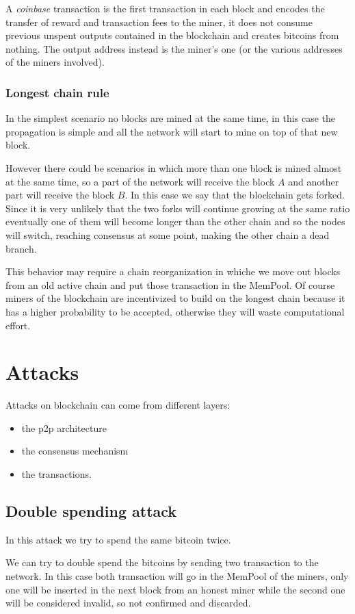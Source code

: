 A \emph{coinbase} transaction is the first transaction in each block and encodes the transfer of reward and transaction fees to the miner, it does not consume previous unspent outputs contained in the blockchain and creates bitcoins from nothing.
The output address instead is the miner's one (or the various addresses of the miners involved).

\subsubsection{Longest chain rule}
In the simplest scenario no blocks are mined at the same time, in this case the propagation is simple and all the network will start to mine on top of that new block.

However there could be scenarios in which more than one block is mined almost at the same time, so a part of the network will receive the block $A$ and another part will receive the block $B$.
In this case we say that the blockchain gets forked.
Since it is very unlikely that the two forks will continue growing at the same ratio eventually one of them will become longer than the other chain and so the nodes will switch, reaching consensus at some point, making the other chain a dead branch.

This behavior may require a chain reorganization in whiche we move out blocks from an old active chain and put those transaction in the MemPool.
Of course miners of the blockchain are incentivized to build on the longest chain because it has a higher probability to be accepted, otherwise they will waste computational effort.

\section{Attacks}
Attacks on blockchain can come from different layers:
\begin{itemize}
    \item the p2p architecture
    \item the consensus mechanism
    \item the transactions.
\end{itemize}

\subsection{Double spending attack}
In this attack we try to spend the same bitcoin twice.

We can try to double spend the bitcoins by sending two transaction to the network.
In this case both transaction will go in the MemPool of the miners, only one will be inserted in the next block from an honest miner while the second one will be considered invalid, so not confirmed and discarded.

